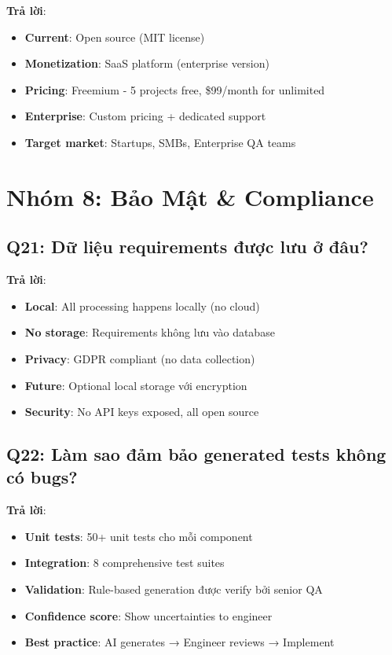 \documentclass[12pt,a4paper]{report}
\begin{document}
\textbf{Trả lời}:
\begin{itemize}
    \item \textbf{Current}: Open source (MIT license)
    \item \textbf{Monetization}: SaaS platform (enterprise version)
    \item \textbf{Pricing}: Freemium - 5 projects free, \$99/month for unlimited
    \item \textbf{Enterprise}: Custom pricing + dedicated support
    \item \textbf{Target market}: Startups, SMBs, Enterprise QA teams
\end{itemize}

\section{Nhóm 8: Bảo Mật & Compliance}

\subsection{Q21: Dữ liệu requirements được lưu ở đâu?}

\textbf{Trả lời}:
\begin{itemize}
    \item \textbf{Local}: All processing happens locally (no cloud)
    \item \textbf{No storage}: Requirements không lưu vào database
    \item \textbf{Privacy}: GDPR compliant (no data collection)
    \item \textbf{Future}: Optional local storage với encryption
    \item \textbf{Security}: No API keys exposed, all open source
\end{itemize}

\subsection{Q22: Làm sao đảm bảo generated tests không có bugs?}

\textbf{Trả lời}:
\begin{itemize}
    \item \textbf{Unit tests}: 50+ unit tests cho mỗi component
    \item \textbf{Integration}: 8 comprehensive test suites
    \item \textbf{Validation}: Rule-based generation được verify bởi senior QA
    \item \textbf{Confidence score}: Show uncertainties to engineer
    \item \textbf{Best practice}: AI generates → Engineer reviews → Implement
\end{itemize}
\end{document}
